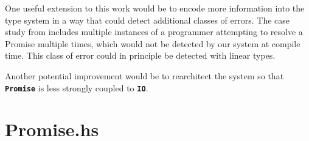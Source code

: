 \documentclass[12pt, english, letterpaper]{kuthesis}
\newcommand{\lit}[1]{\textbf{\texttt{#1}}}
\begin{document}
One useful extension to this work would be to encode more information into the type system in a way that could detect additional classes of errors.  The case study from \cite{madsen} includes multiple instances of a programmer attempting to resolve a \textsf{Promise} multiple times, which would not be detected by our system at compile time.  This class of error could in principle be detected with linear types.

Another potential improvement would be to rearchitect the system so that \lit{Promise} is less strongly coupled to \lit{IO}.





\appendix
\chapter*{Promise.hs}
\end{document}
